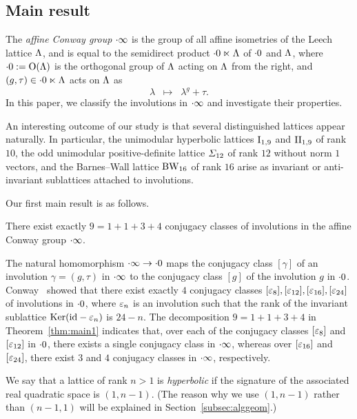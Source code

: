 \documentclass{amsart} %
\begin{document}
\subsection{Main result}
%
The \emph{affine Conway group} $\cdot \infty$ is the group of 
all affine isometries of the Leech lattice $\Lambda$,
and is equal to the semidirect product $\cdot 0 \ltimes \Lambda$
of $\cdot 0$ and $\Lambda$,
where $\cdot 0:=\mathord{\mathrm{O}}(\Lambda)$ is the orthogonal group of $\Lambda$
acting on $\Lambda$ from the right, and 
$(g, \tau)\in \cdot 0 \ltimes \Lambda$ acts on $\Lambda$ as
\[
\lambda\;\;\mapsto\;\; \lambda^g+\tau.
\]
In this paper,
we classify the involutions in $\cdot \infty$ and investigate their properties. 
\par
An interesting outcome of our study is that 
several distinguished lattices appear naturally. 
In particular, the unimodular hyperbolic lattices $\mathrm{I}_{1, 9}$ and $\mathrm{II}_{1, 9}$ of rank $10$, 
the odd unimodular positive-definite lattice $\varSigma_{12}$ 
of rank $12$ without norm $1$ vectors, 
and the Barnes--Wall lattice $\mathrm{BW}_{16}$ of rank $16$ 
arise as invariant or anti-invariant sublattices attached to involutions.
\par
Our first main result is as follows.
%
%
\begin{theorem}\label{thm:main1}
There exist exactly 
$9=1+1+3+4$
conjugacy classes of involutions in the affine Conway group $\cdot \infty$.
\end{theorem}
%
The natural homomorphism $\cdot \infty \to \cdot 0$ maps
the conjugacy class $[\gamma]$ of an involution $\gamma=(g, \tau)$
in $\cdot \infty$ to the conjugacy class $[g]$ of the involution $g$ in $\cdot 0$. 
Conway~\cite[Chapter 10,~Section 3.7]{theCSbook}
showed that there exist exactly $4$ conjugacy classes
$[\varepsilon_8], [\varepsilon_{12}], [\varepsilon_{16}], [\varepsilon_{24}]$ of involutions in $\cdot 0$,
where $\varepsilon_n$ is an involution such that the rank of 
the invariant sublattice 
$\operatorname{Ker}(\mathord{\mathrm{id}}-\varepsilon_n)$ is $24-n$.
The decomposition $9=1+1+3+4$ in Theorem~\ref{thm:main1} 
indicates that, over each of the conjugacy classes $[\varepsilon_8]$ and $ [\varepsilon_{12}]$ in $\cdot 0$,
there exists a single conjugacy class in $\cdot \infty$,
whereas over %
$[\varepsilon_{16}]$ and~$ [\varepsilon_{24}]$, %
there exist $3$ and $4$ conjugacy classes
in $\cdot \infty$, respectively.
\par
%
We say that a lattice of rank $n>1$ is \emph{hyperbolic}
if the signature of the associated real quadratic space is $(1, n-1)$.
(The reason why we use $(1, n-1)$ rather than $(n-1, 1)$ 
will be explained in Section~\ref{subsec:alggeom}.)
\end{document}
